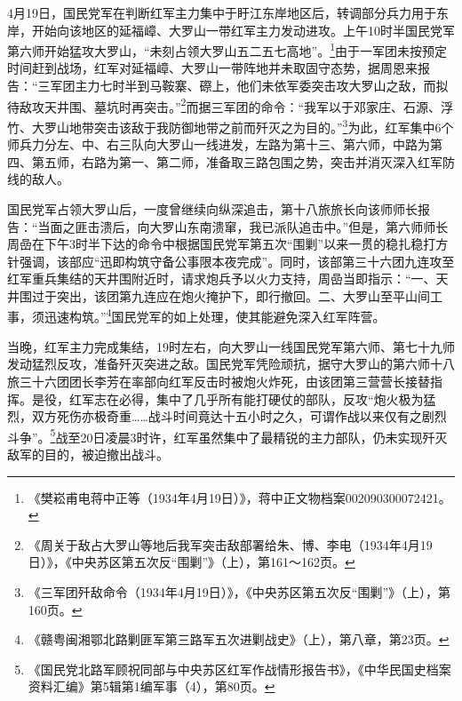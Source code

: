 4月19日，国民党军在判断红军主力集中于盱江东岸地区后，转调部分兵力用于东岸，开始向该地区的延福嶂、大罗山一带红军主力发动进攻。上午10时半国民党军第六师开始猛攻大罗山，“未刻占领大罗山五二五七高地”。\footnote{《樊崧甫电蒋中正等（1934年4月19日）》，蒋中正文物档案002090300072421。}由于一军团未按预定时间赶到战场，红军对延福嶂、大罗山一带阵地并未取固守态势，据周恩来报告：“三军团主力七时半到马鞍寨、磜上，他们未依军委突击攻大罗山之敌，而拟待敌攻天井围、墓坑时再突击。”\footnote{《周关于敌占大罗山等地后我军突击敌部署给朱、博、李电（1934年4月19日）》，《中央苏区第五次反“围剿”》（上），第161～162页。}而据三军团的命令：“我军以于邓家庄、石源、浮竹、大罗山地带突击该敌于我防御地带之前而歼灭之为目的。”\footnote{《三军团歼敌命令（1934年4月19日）》，《中央苏区第五次反“围剿”》（上），第160页。}为此，红军集中6个师兵力分左、中、右三队向大罗山一线进发，左路为第十三、第六师，中路为第四、第五师，右路为第一、第二师，准备取三路包围之势，突击并消灭深入红军防线的敌人。


国民党军占领大罗山后，一度曾继续向纵深追击，第十八旅旅长向该师师长报告：“当面之匪击溃后，向大罗山东南溃窜，我已派队追击中。”但是，第六师师长周嵒在下午3时半下达的命令中根据国民党军第五次“围剿”以来一贯的稳扎稳打方针强调，该部应“迅即构筑守备公事限本夜完成”。同时，该部第三十六团九连攻至红军重兵集结的天井围附近时，请求炮兵予以火力支持，周嵒当即指示：“一、天井围过于突出，该团第九连应在炮火掩护下，即行撤回。二、大罗山至平山间工事，须迅速构筑。”\footnote{《赣粤闽湘鄂北路剿匪军第三路军五次进剿战史》（上），第八章，第23页。}国民党军的如上处理，使其能避免深入红军阵营。


当晚，红军主力完成集结，19时左右，向大罗山一线国民党军第六师、第七十九师发动猛烈反攻，准备歼灭突进之敌。国民党军凭险顽抗，据守大罗山的第六师十八旅三十六团团长李芳在率部向红军反击时被炮火炸死，由该团第三营营长接替指挥。是役，红军志在必得，集中了几乎所有能打硬仗的部队，反攻“炮火极为猛烈，双方死伤亦极奇重……战斗时间竟达十五小时之久，可谓作战以来仅有之剧烈斗争”。\footnote{《国民党北路军顾祝同部与中央苏区红军作战情形报告书》，《中华民国史档案资料汇编》第5辑第1编军事（4），第80页。}战至20日凌晨3时许，红军虽然集中了最精锐的主力部队，仍未实现歼灭敌军的目的，被迫撤出战斗。


